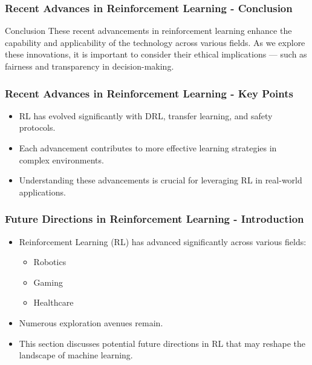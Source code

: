 \documentclass[aspectratio=169]{beamer}
\begin{document}
\begin{frame}[fragile]
    \frametitle{Recent Advances in Reinforcement Learning - Conclusion}
    \begin{block}{Conclusion}
        These recent advancements in reinforcement learning enhance the capability and applicability of the technology across various fields. As we explore these innovations, it is important to consider their ethical implications — such as fairness and transparency in decision-making.
    \end{block}
\end{frame}

\begin{frame}[fragile]
    \frametitle{Recent Advances in Reinforcement Learning - Key Points}
    \begin{itemize}
        \item RL has evolved significantly with DRL, transfer learning, and safety protocols.
        \item Each advancement contributes to more effective learning strategies in complex environments.
        \item Understanding these advancements is crucial for leveraging RL in real-world applications.
    \end{itemize}
\end{frame}

\begin{frame}[fragile]
    \frametitle{Future Directions in Reinforcement Learning - Introduction}
    \begin{itemize}
        \item Reinforcement Learning (RL) has advanced significantly across various fields:
            \begin{itemize}
                \item Robotics
                \item Gaming
                \item Healthcare
            \end{itemize}
        \item Numerous exploration avenues remain.
        \item This section discusses potential future directions in RL that may reshape the landscape of machine learning.
    \end{itemize}
\end{frame}
\end{document}
